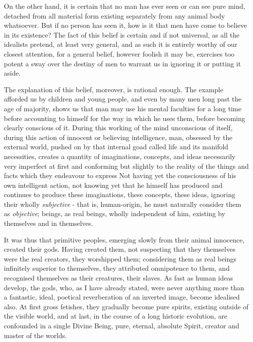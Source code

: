 \documentclass[12pt]{report}
\begin{document}
On the other hand, it is certain that no man has ever seen or can see pure mind, detached from all material form existing separately from any animal body whatsoever. But if no person has seen it, how is it that men have come to believe in its existence? The fact of this belief is certain and if not universal, as all the idealists pretend, at least very general, and as such it is entirely worthy of our closest attention, for a general belief, however foolish it may be, exercises too potent a sway over the destiny of men to warrant us in ignoring it or putting it aside.


The explanation of this belief, moreover, is rational enough. The example afforded us by children and young people, and even by many men long past the age of majority, shows us that man may use his mental faculties for a long time before accounting to himself for the way in which he uses them, before becoming clearly conscious of it. During this working of the mind unconscious of itself, during this action of innocent or believing intelligence, man, obsessed by the external world, pushed on by that internal goad called life and its manifold necessities, creates a quantity of imaginations, concepts, and ideas necessarily very imperfect at first and conforming but slightly to the reality of the things and facts which they endeavour to express Not having yet the consciousness of his own intelligent action, not knowing yet that he himself has produced and continues to produce these imaginations, these concepts, these ideas, ignoring their wholly \emph{subjective }- that is, human-origin, he must naturally consider them as \emph{objective}; beings, as real beings, wholly independent of him, existing by themselves and in themselves.


It was thus that primitive peoples, emerging slowly from their animal innocence, created their gods. Having created them, not suspecting that they themselves were the real creators, they worshipped them; considering them as real beings infinitely superior to themselves, they attributed omnipotence to them, and recognised themselves as their creatures, their slaves. As fast as human ideas develop, the gods, who, as I have already stated, were never anything more than a fantastic, ideal, poetical reverberation of an inverted image, become idealised also. At first gross fetishes, they gradually become pure spirits, existing outside of the visible world, and at last, in the course of a long historic evolution, are confounded in a single Divine Being, pure, eternal, absolute Spirit, creator and master of the worlds.
\end{document}
